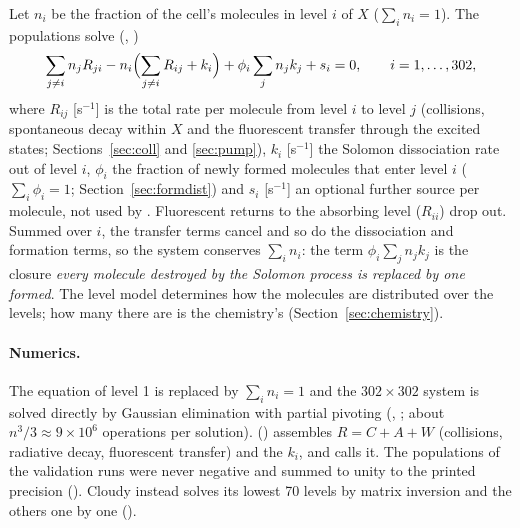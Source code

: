 Let $n_i$ be the fraction of the cell's \Htwo{} molecules in level $i$ of $X$
($\sum_i n_i=1$). The populations solve (,
)
\begin{equation}
  \sum_{j\neq i} n_j R_{ji} - n_i\Bigl(\sum_{j\neq i} R_{ij} + k_i\Bigr)
  + \phi_i \sum_j n_j k_j + s_i = 0,\qquad i=1,\ldots,302,
  \label{eq:balance}
\end{equation}
where $R_{ij}$ [s$^{-1}$] is the total rate per molecule from level $i$ to
level $j$ (collisions, spontaneous decay within $X$ and the fluorescent
transfer through the excited states; Sections~\ref{sec:coll} and
\ref{sec:pump}), $k_i$ [s$^{-1}$] the Solomon dissociation rate out of level
$i$, $\phi_i$ the fraction of newly formed molecules that enter level $i$
($\sum_i\phi_i=1$; Section~\ref{sec:formdist}) and $s_i$ [s$^{-1}$] an optional
further source per molecule, not used by . Fluorescent returns
to the absorbing level ($R_{ii}$) drop out. Summed over $i$, the transfer terms
cancel and so do the dissociation and formation terms, so the system
conserves $\sum_in_i$: the term $\phi_i\sum_jn_jk_j$ is the closure \emph{every
molecule destroyed by the Solomon process is replaced by one formed}. The
level model determines how the molecules are distributed over the levels;
how many there are is the chemistry's (Section~\ref{sec:chemistry}).

\paragraph{Numerics.} The equation of level 1 is replaced by $\sum_in_i=1$
and the $302\times302$ system is solved directly by Gaussian elimination with
partial pivoting (, ; about
$n^3/3\approx9\times10^6$ operations per solution). 
() assembles $R=C+A+W$ (collisions, radiative decay,
fluorescent transfer) and the $k_i$, and calls it. The populations of the
validation runs were never negative and summed to unity to the printed
precision (). Cloudy instead solves its lowest 70 levels by matrix
inversion and the others one by one ().

